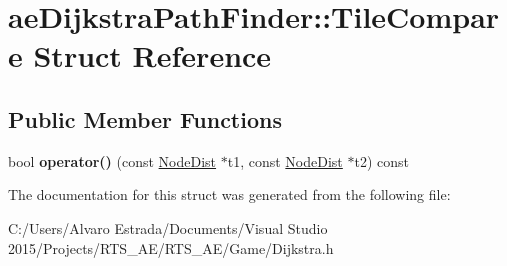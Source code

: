 \hypertarget{structae_dijkstra_path_finder_1_1_tile_compare}{}\section{ae\+Dijkstra\+Path\+Finder\+:\+:Tile\+Compare Struct Reference}
\label{structae_dijkstra_path_finder_1_1_tile_compare}
\subsection*{Public Member Functions}
\begin{DoxyCompactItemize}
\item 
bool {\bfseries operator()} (const \hyperlink{structae_dijkstra_path_finder_1_1_node_dist}{Node\+Dist} $\ast$t1, const \hyperlink{structae_dijkstra_path_finder_1_1_node_dist}{Node\+Dist} $\ast$t2) const \hypertarget{structae_dijkstra_path_finder_1_1_tile_compare_af62f9684bd29ed63bf1c3d1622cb2d82}{}\label{structae_dijkstra_path_finder_1_1_tile_compare_af62f9684bd29ed63bf1c3d1622cb2d82}

\end{DoxyCompactItemize}


The documentation for this struct was generated from the following file\+:\begin{DoxyCompactItemize}
\item 
C\+:/\+Users/\+Alvaro Estrada/\+Documents/\+Visual Studio 2015/\+Projects/\+R\+T\+S\+\_\+\+A\+E/\+R\+T\+S\+\_\+\+A\+E/\+Game/Dijkstra.\+h\end{DoxyCompactItemize}
